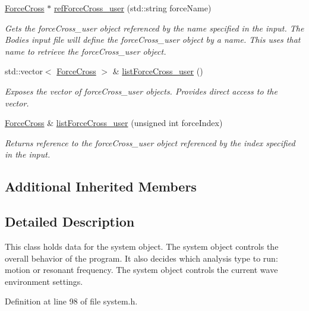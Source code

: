 \begin{DoxyCompactItemize}
\hyperlink{classosea_1_1ofreq_1_1_force_cross}{Force\-Cross} $\ast$ \hyperlink{classosea_1_1ofreq_1_1_system_a22c14580904007e564bfba6ab0d052c4}{ref\-Force\-Cross\-\_\-user} (std\-::string force\-Name)
\begin{DoxyCompactList}\small\item\em Gets the force\-Cross\-\_\-user object referenced by the name specified in the input. The Bodies input file will define the force\-Cross\-\_\-user object by a name. This uses that name to retrieve the force\-Cross\-\_\-user object. \end{DoxyCompactList}\item 
std\-::vector$<$ \hyperlink{classosea_1_1ofreq_1_1_force_cross}{Force\-Cross} $>$ \& \hyperlink{classosea_1_1ofreq_1_1_system_aae7cb5596f9d3a44f0bc6fe58b58410a}{list\-Force\-Cross\-\_\-user} ()
\begin{DoxyCompactList}\small\item\em Exposes the vector of force\-Cross\-\_\-user objects. Provides direct access to the vector. \end{DoxyCompactList}\item 
\hyperlink{classosea_1_1ofreq_1_1_force_cross}{Force\-Cross} \& \hyperlink{classosea_1_1ofreq_1_1_system_adcde247d6fe68ee68a65f1a5f2dc8e13}{list\-Force\-Cross\-\_\-user} (unsigned int force\-Index)
\begin{DoxyCompactList}\small\item\em Returns reference to the force\-Cross\-\_\-user object referenced by the index specified in the input. \end{DoxyCompactList}\end{DoxyCompactItemize}
\subsection*{Additional Inherited Members}


\subsection{Detailed Description}
This class holds data for the system object. The system object controls the overall behavior of the program. It also decides which analysis type to run\-: motion or resonant frequency. The system object controls the current wave environment settings. 

Definition at line 98 of file system.\-h.



